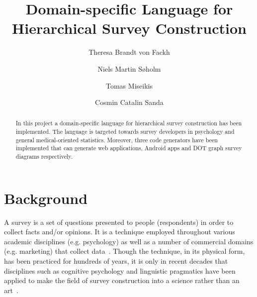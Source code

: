 \documentclass[runningheads,a4paper]{llncs}
\begin{document}
\mainmatter  %

\title{Domain-specific Language for Hierarchical Survey Construction}


%
%
\author{Theresa Brandt von Fackh\and Niels Martin S{\o}holm\and Tomas Miseikis\and Cosmin Catalin Sanda}
%


%
%

\maketitle

\begin{abstract}
In this project a domain-specific language for hierarchical survey construction has been implemented. The language is targeted towards survey developers in psychology and general medical-oriented statistics. Moreover, three code generators have been implemented that can generate web applications, Android apps and DOT graph survey diagrams respectively.
\end{abstract}

\section{Background}
\label{sec:background}
A survey is a set of questions presented to people (respondents) in order to collect facts and/or opinions. It is a technique employed throughout various academic disciplines (e.g. psychology) as well as a number of commercial domains (e.g. marketing) that collect data~\cite{synodinos}. Though the technique, in its physical form, has been practiced for hundreds of years, it is only in recent decades that disciplines such as cognitive psychology and linguistic pragmatics have been applied to make the field of survey construction into a science rather than an art~\cite{martin}.
\end{document}
